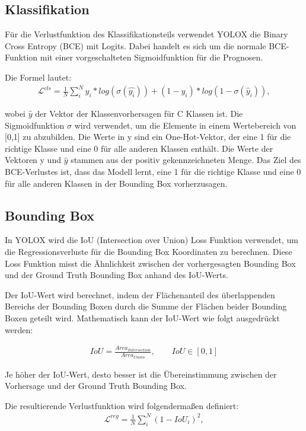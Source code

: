 \subsection{Klassifikation}\label{chap:yoloxClassification}
Für die Verlustfunktion des Klassifikationsteils verwendet YOLOX die Binary Cross Entropy (BCE) mit Logits. Dabei handelt es sich um die normale BCE-Funktion mit einer vorgeschalteten Sigmoidfunktion für die Prognosen.

Die Formel lautet:
\begin{align}
	\mathcal{L}^{cls}=\frac{1}{N}\sum_{i}^{N}y_i*log(\sigma(\hat{y_i}))+(1-y_i)*log(1-\sigma(\hat{y}_i)),
\end{align}

wobei $\hat{y}$ der Vektor der Klassenvorhersagen für C Klassen ist. Die Sigmoidfunktion $\sigma$ wird verwendet, um die Elemente in einem Wertebereich von [0,1] zu abzubilden. Die Werte in y sind ein One-Hot-Vektor, der eine 1 für die richtige Klasse und eine 0 für alle anderen Klassen enthält. Die Werte der Vektoren y und $\hat{y}$ stammen aus der positiv gekennzeichneten Menge. Das Ziel des BCE-Verlustes ist, dass das Modell lernt, eine 1 für die richtige Klasse und eine 0 für alle anderen Klassen in der Bounding Box vorherzusagen. \cite{yoloxExplanationHowWorks}

\subsection{Bounding Box}
In YOLOX wird die IoU (Intersection over Union) Loss Funktion verwendet, um die Regressionsverluste für die Bounding Box Koordinaten zu berechnen. Diese Loss Funktion misst die Ähnlichkeit zwischen der vorhergesagten Bounding Box und der Ground Truth Bounding Box anhand des IoU-Werts.

Der IoU-Wert wird berechnet, indem der Flächenanteil des überlappenden Bereichs der Bounding Boxen durch die Summe der Flächen beider Bounding Boxen geteilt wird. Mathematisch kann der IoU-Wert wie folgt ausgedrückt werden:

\begin{align}
	IoU = \frac{Area_{Intersection}}{Area_{Unoin}}, \qquad IoU \in [0,1]
\end{align}

Je höher der IoU-Wert, desto besser ist die Übereinstimmung zwischen der Vorhersage und der Ground Truth Bounding Box.

Die resultierende Verlustfunktion wird folgendermaßen definiert:
\begin{align}
	\mathcal{L}^{reg} = \frac{1}{N}\sum_{i}^{N}(1-IoU_i)^2,
\end{align}

